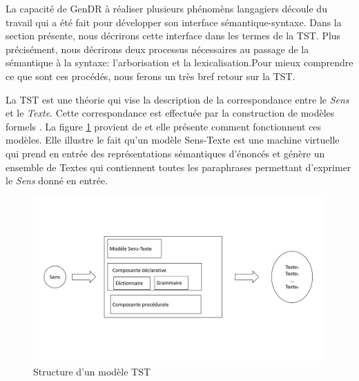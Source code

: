 La capacité de GenDR à réaliser plusieurs phénomèns langagiers découle du travail qui a été fait pour développer son interface sémantique-syntaxe. Dans la section présente, nous décrirons cette interface dans les termes de la \ac{TST}. Plus précisément, nous décrirons deux processus nécessaires au passage de la sémantique à la syntaxe: l'arborisation et la lexicalisation.Pour mieux comprendre ce que sont ces procédés, nous ferons un très bref retour sur la \ac{TST}. 

La \ac{TST} est une théorie qui vise la description de la correspondance entre le \emph{Sens} et le \emph{Texte}. Cette correspondance est effectuée par la construction de modèles formels \citep{PolgueretheorieSensTexte1998}. La figure \ref{fig:modeletst} provient de \citep{PolgueretheorieSensTexte1998} et elle présente comment fonctionnent ces modèles. Elle illustre le fait qu'un modèle Sens-Texte est une machine virtuelle qui prend en entrée des représentations sémantiques d'énoncés et génère un ensemble de Textes qui contiennent toutes les paraphrases permettant d'exprimer le \emph{Sens} donné en entrée. 
\begin{figure}[htb]
	\centering
	\includegraphics[width=1\textwidth, trim = {0cm 3cm 0cm 3cm},clip]{ch3/figs/polguere1.pdf}
	\caption{Structure d'un modèle TST}
	\label{fig:modeletst}
\end{figure}

